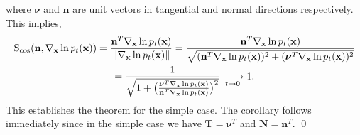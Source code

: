 where $\boldsymbol{\nu}$ and $\textbf{n}$ are unit vectors in tangential and normal directions respectively. This implies,
\begin{gather*}
    \text{S}_{\cos} (\textbf{n}, \nabla_\textbf{x} \ln p_t(\textbf{x})) 
    = \frac{\textbf{n}^T  \nabla_\textbf{x} \ln p_t(\textbf{x})}{\left\lVert  \nabla_\textbf{x} \ln p_t(\textbf{x}) \right\rVert} 
    = \frac{\textbf{n}^T  \nabla_\textbf{x} \ln p_t(\textbf{x})}{\sqrt{(\textbf{n}^T  \nabla_\textbf{x} \ln p_t(\textbf{x}))^2 + (\boldsymbol{\nu}^T  \nabla_\textbf{x} \ln p_t(\textbf{x}))^2}} 
    \\ = \frac{1}{\sqrt{1 + \big( \frac{\boldsymbol{\nu}^T\nabla_\textbf{x} \ln p_t(\textbf{x})}{\textbf{n}^T  \nabla_\textbf{x} \ln p_t(\textbf{x})} \big)^2}} 
    \xrightarrow[t \to 0]{} 1.
\end{gather*}
This establishes the theorem for the simple case. The corollary follows immediately since in the simple case we have $\mathbf{T} = \boldsymbol{\nu}^T$ and $\mathbf{N}=\textbf{n}^T$. \qed

